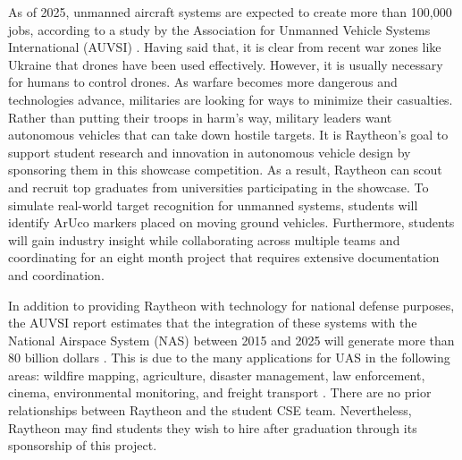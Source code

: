 
As of 2025, unmanned aircraft systems are expected to create more than 100,000 jobs, according to a study by the Association for Unmanned Vehicle Systems International (AUVSI) \cite{AUVSI}. Having said that, it is clear from recent war zones like Ukraine that drones have been used effectively. However, it is usually necessary for humans to control drones. As warfare becomes more dangerous and technologies advance, militaries are looking for ways to minimize their casualties. Rather than putting their troops in harm's way, military leaders want autonomous vehicles that can take down hostile targets. It is Raytheon's goal to support student research and innovation in autonomous vehicle design by sponsoring them in this showcase competition. As a result, Raytheon can scout and recruit top graduates from universities participating in the showcase. To simulate real-world target recognition for unmanned systems, students will identify ArUco markers placed on moving ground vehicles. Furthermore, students will gain industry insight while collaborating across multiple teams and coordinating for an eight month project that requires extensive documentation and coordination.

In addition to providing Raytheon with technology for national defense purposes, the AUVSI report estimates that the integration of these systems with the National Airspace System (NAS) between 2015 and 2025 will generate more than 80 billion dollars \cite{AUVSI}. This is due to the many applications for UAS in the following areas: wildfire mapping, agriculture, disaster management, law enforcement, cinema, environmental monitoring, and freight transport \cite{AUVSI}. There are no prior relationships between Raytheon and the student CSE team. Nevertheless, Raytheon may find students they wish to hire after graduation through its sponsorship of this project.
